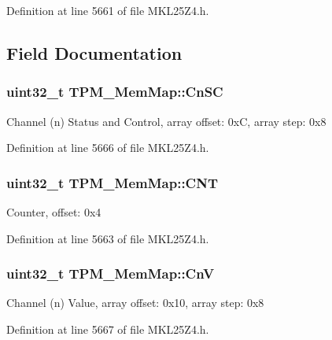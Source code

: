 Definition at line 5661 of file M\+K\+L25\+Z4.\+h.



\subsection{Field Documentation}
\subsubsection[{\texorpdfstring{Cn\+SC}{CnSC}}]{\setlength{\rightskip}{0pt plus 5cm}uint32\+\_\+t T\+P\+M\+\_\+\+Mem\+Map\+::\+Cn\+SC}\hypertarget{struct_t_p_m___mem_map_a62c97f42d3dcb6b93f06ca42e3fe7fba}{}\label{struct_t_p_m___mem_map_a62c97f42d3dcb6b93f06ca42e3fe7fba}
Channel (n) Status and Control, array offset\+: 0xC, array step\+: 0x8 

Definition at line 5666 of file M\+K\+L25\+Z4.\+h.

\subsubsection[{\texorpdfstring{C\+NT}{CNT}}]{\setlength{\rightskip}{0pt plus 5cm}uint32\+\_\+t T\+P\+M\+\_\+\+Mem\+Map\+::\+C\+NT}\hypertarget{struct_t_p_m___mem_map_ac86225aa77135d95142aa86b8c0fe010}{}\label{struct_t_p_m___mem_map_ac86225aa77135d95142aa86b8c0fe010}
Counter, offset\+: 0x4 

Definition at line 5663 of file M\+K\+L25\+Z4.\+h.

\subsubsection[{\texorpdfstring{CnV}{CnV}}]{\setlength{\rightskip}{0pt plus 5cm}uint32\+\_\+t T\+P\+M\+\_\+\+Mem\+Map\+::\+CnV}\hypertarget{struct_t_p_m___mem_map_a352e4ab0141e02eff068ec3047693065}{}\label{struct_t_p_m___mem_map_a352e4ab0141e02eff068ec3047693065}
Channel (n) Value, array offset\+: 0x10, array step\+: 0x8 

Definition at line 5667 of file M\+K\+L25\+Z4.\+h.

